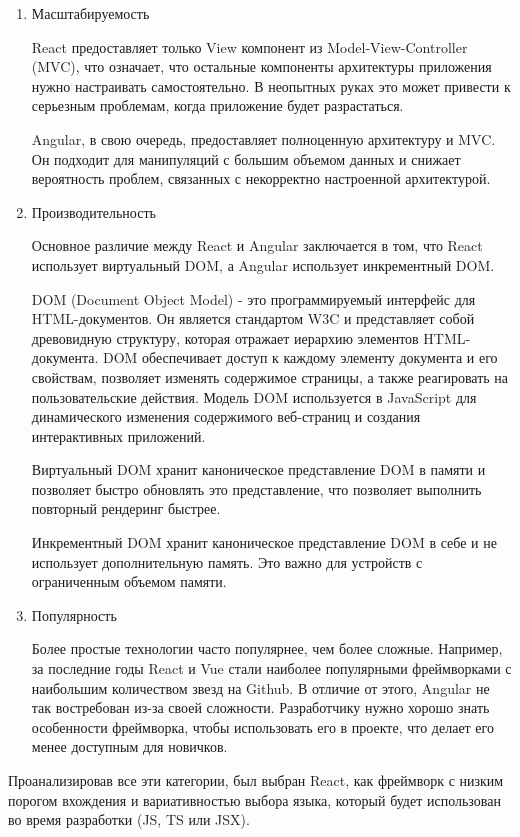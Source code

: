 \begin{enumerate}
     \item Масштабируемость

     React предоставляет только View компонент из Model-View-Controller (MVC), что означает, что остальные компоненты архитектуры приложения нужно настраивать самостоятельно. В неопытных руках это может привести к серьезным проблемам, когда приложение будет разрастаться.
     
     Angular, в свою очередь, предоставляет полноценную архитектуру и MVC. Он подходит для манипуляций с большим объемом данных и снижает вероятность проблем, связанных с некорректно настроенной архитектурой.

     \item Производительность

     Основное различие между React и Angular заключается в том, что React использует виртуальный DOM, а Angular использует инкрементный DOM.

     DOM (Document Object Model) - это программируемый интерфейс для HTML-документов. Он является стандартом W3C и представляет собой древовидную структуру, которая отражает иерархию элементов HTML-документа. DOM обеспечивает доступ к каждому элементу документа и его свойствам, позволяет изменять содержимое страницы, а также реагировать на пользовательские действия. Модель DOM используется в JavaScript для динамического изменения содержимого веб-страниц и создания интерактивных приложений.
     
     Виртуальный DOM хранит каноническое представление DOM в памяти и позволяет быстро обновлять это представление, что позволяет выполнить повторный рендеринг быстрее.
     
     Инкрементный DOM хранит каноническое представление DOM в себе и не использует дополнительную память. Это важно для устройств с ограниченным объемом памяти.

     \item Популярность
     
     Более простые технологии часто популярнее, чем более сложные. Например, за последние годы React и Vue стали наиболее популярными фреймворками с наибольшим количеством звезд на Github. В отличие от этого, Angular не так востребован из-за своей сложности. Разработчику нужно хорошо знать особенности фреймворка, чтобы использовать его в проекте, что делает его менее доступным для новичков.
\end{enumerate}

Проанализировав все эти категории, был выбран React, как фреймворк с низким порогом вхождения и вариативностью выбора языка, который будет использован во время разработки (JS, TS или JSX). 

